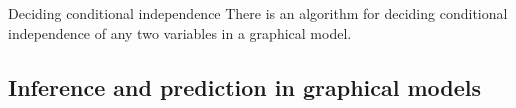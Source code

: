 



\begin{frame}
  \begin{alertblock}{Deciding conditional independence}
    There is an algorithm for deciding conditional independence of any two variables in a graphical model.
  \end{alertblock}

\end{frame}

\subsection{Inference and prediction in graphical models}

